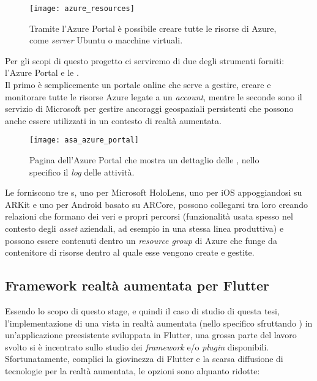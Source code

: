 \begin{figure}[H]
  \centering
  \texttt{[image: azure\_resources]}
  \caption[Azure Portal creazione risorse]{Tramite l'Azure Portal è possibile creare tutte le risorse di Azure, come \textit{server} Ubuntu o macchine virtuali.}
\end{figure}

Per gli scopi di questo progetto ci serviremo di due degli strumenti forniti: l'Azure Portal e le \asa{}.\\
Il primo è semplicemente un portale online che serve a gestire, creare e monitorare tutte le risorse Azure legate a un \textit{account}, mentre le seconde sono il servizio di Microsoft per gestire ancoraggi geospaziali persistenti che possono anche essere utilizzati in un contesto di realtà aumentata.

\begin{figure}[H]
  \centering
  \texttt{[image: asa\_azure\_portal]}
  \caption[Azure Portal \asa{}]{Pagina dell'Azure Portal che mostra un dettaglio delle \asa{}, nello specifico il \textit{log} delle attività.}
\end{figure}

Le \asa{} forniscono tre \sdk{}s, uno per Microsoft HoloLens, uno per iOS appoggiandosi su ARKit e uno per Android basato su ARCore, possono collegarsi tra loro creando relazioni che formano dei veri e propri percorsi (funzionalità usata spesso nel contesto degli \textit{asset} aziendali, ad esempio in una stessa linea produttiva) e possono essere contenuti dentro un \textit{resource group} di Azure che funge da contenitore di risorse dentro al quale esse vengono create e gestite.

\subsection{Framework realtà aumentata per Flutter}
Essendo lo scopo di questo stage, e quindi il caso di studio di questa tesi, l'implementazione di una vista in realtà aumentata (nello specifico sfruttando \asa{}) in un'applicazione preesistente sviluppata in Flutter, una grossa parte del lavoro svolto si è incentrato sullo studio dei \textit{framework} e/o \textit{plugin} disponibili.\\
Sfortunatamente, complici la giovinezza di Flutter e la scarsa diffusione di tecnologie per la realtà aumentata, le opzioni sono alquanto ridotte:


